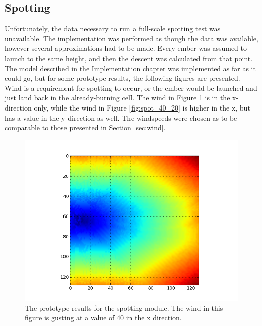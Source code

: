 \subsection*{Spotting}
Unfortunately, the data necessary to run a full-scale spotting test was unavailable. The implementation was performed as though the data was available, however several approximations had to be made. Every ember was assumed to launch to the same height, and then the descent was calculated from that point. The model described in the Implementation chapter was implemented as far as it could go, but for some prototype results, the following figures are presented. Wind is a requirement for spotting to occur, or the ember would be launched and just land back in the already-burning cell. The wind in Figure \ref{fig:spot_40} is in the x-direction only, while the wind in Figure \ref{fig:spot_40_20} is higher in the x, but has a value in the y direction as well. The windspeeds were chosen as to be comparable to those presented in Section \ref{sec:wind}.
\begin{figure}%
\centering
  \includegraphics[height=.38\textheight]{figures/results/spot_40.png}
  \caption{The prototype results for the spotting module. The wind in this figure is gusting at a value of 40 in the x direction.}
  \label{fig:spot_40}
\end{figure}  
